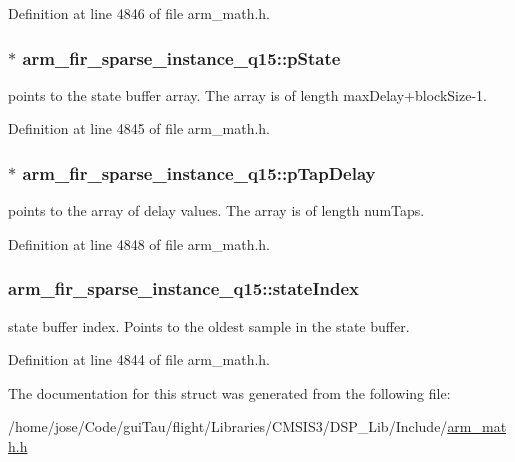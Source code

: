 Definition at line 4846 of file arm\-\_\-math.\-h.

\hypertarget{structarm__fir__sparse__instance__q15_a98b92b0f5208110129b9a67b1db90408}{
\subsubsection[{p\-State}]{$\ast$ arm\-\_\-fir\-\_\-sparse\-\_\-instance\-\_\-q15\-::p\-State}}\label{structarm__fir__sparse__instance__q15_a98b92b0f5208110129b9a67b1db90408}
points to the state buffer array. The array is of length max\-Delay+block\-Size-\/1. 

Definition at line 4845 of file arm\-\_\-math.\-h.

\hypertarget{structarm__fir__sparse__instance__q15_aeab2855176c6efdb231a73a3672837d5}{
\subsubsection[{p\-Tap\-Delay}]{$\ast$ arm\-\_\-fir\-\_\-sparse\-\_\-instance\-\_\-q15\-::p\-Tap\-Delay}}\label{structarm__fir__sparse__instance__q15_aeab2855176c6efdb231a73a3672837d5}
points to the array of delay values. The array is of length num\-Taps. 

Definition at line 4848 of file arm\-\_\-math.\-h.

\hypertarget{structarm__fir__sparse__instance__q15_a89487f28cab52637426024005e478985}{
\subsubsection[{state\-Index}]{ arm\-\_\-fir\-\_\-sparse\-\_\-instance\-\_\-q15\-::state\-Index}}\label{structarm__fir__sparse__instance__q15_a89487f28cab52637426024005e478985}
state buffer index. Points to the oldest sample in the state buffer. 

Definition at line 4844 of file arm\-\_\-math.\-h.



The documentation for this struct was generated from the following file\-:\begin{DoxyCompactItemize}
\item 
/home/jose/\-Code/gui\-Tau/flight/\-Libraries/\-C\-M\-S\-I\-S3/\-D\-S\-P\-\_\-\-Lib/\-Include/\hyperlink{arm__math_8h}{arm\-\_\-math.\-h}\end{DoxyCompactItemize}
